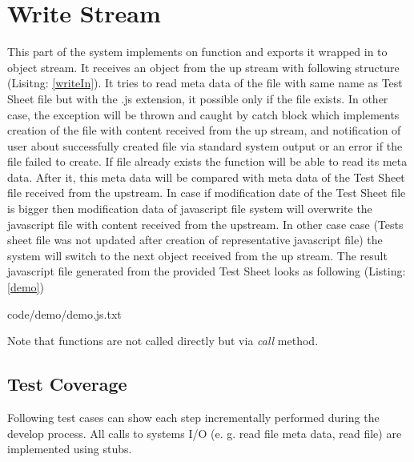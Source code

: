\section{Write Stream}

This part of the system implements on function and exports it wrapped in to object stream. It receives an object from the up stream with following structure (Lisitng: \ref{writeIn}). It tries to read meta data of the file with same name as Test Sheet file but with the .js extension, it possible only if the file exists. In other case, the exception will be thrown and caught by catch block which implements creation of the file with content received from the up stream, and notification of user about successfully created file via standard system output or an error if the file failed to create. If file already exists the function will be able to read its meta data. After it, this meta data will be compared with meta data of the Test Sheet file received from the upstream. In case if modification date of the Test Sheet file is bigger then modification data of javascript file system will overwrite the javascript file with content received from the upstream. In other case case (Tests sheet file was not updated after creation of representative javascript file) the system will switch to the next object received from the up stream. The result javascript file generated from the provided Test Sheet looks as following (Listing: \ref{demo})


{code/demo/demo.js.txt}

Note that functions are not called directly but via \textit{call} method.

%

\subsection{Test Coverage}
Following test cases can show each step incrementally performed during the develop process. All calls to systems I/O (e. g. read file meta data, read file) are implemented using stubs.
%


